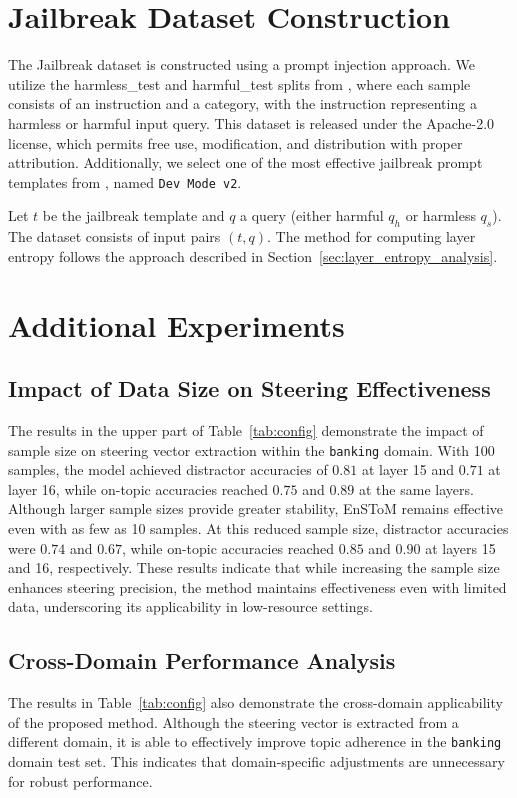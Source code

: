 \documentclass[11pt]{article}
\begin{document}
\section{Jailbreak Dataset Construction}\label{sec:jailbreak}
The Jailbreak dataset is constructed using a prompt injection approach. We utilize the harmless\_test and harmful\_test splits from \citet{arditi2024refusal}, where each sample consists of an instruction and a category, with the instruction representing a harmless or harmful input query. This dataset is released under the Apache-2.0 license, which permits free use, modification, and distribution with proper attribution. Additionally, we select one of the most effective jailbreak prompt templates from \cite{10.1145/3658644.3670388}, named \texttt{Dev Mode v2}.

Let \( t \) be the jailbreak template and \( q \) a query (either harmful \( q_h \) or harmless \( q_s \)). The dataset consists of input pairs \( (t, q) \). The method for computing layer entropy follows the approach described in Section~\ref{sec:layer_entropy_analysis}.

\section{Additional Experiments}\label{sec:add_ex}
\subsection{Impact of Data Size on Steering Effectiveness}
The results in the upper part of Table~\ref{tab:config} demonstrate the impact of sample size on steering vector extraction within the \texttt{banking} domain. With 100 samples, the model achieved distractor accuracies of \(0.81\) at layer 15 and \(0.71\) at layer 16, while on-topic accuracies reached \(0.75\) and \(0.89\) at the same layers.  
Although larger sample sizes provide greater stability, EnSToM remains effective even with as few as 10 samples. At this reduced sample size, distractor accuracies were \(0.74\) and \(0.67\), while on-topic accuracies reached \(0.85\) and \(0.90\) at layers 15 and 16, respectively.  
These results indicate that while increasing the sample size enhances steering precision, the method maintains effectiveness even with limited data, underscoring its applicability in low-resource settings.


\subsection{Cross-Domain Performance Analysis}\label{sec:cross-domain}
The results in Table~\ref{tab:config} also demonstrate the cross-domain applicability of the proposed method. Although the steering vector is extracted from a different domain, it is able to effectively improve topic adherence in the \texttt{banking} domain test set. This indicates that domain-specific adjustments are unnecessary for robust performance. 
\end{document}
